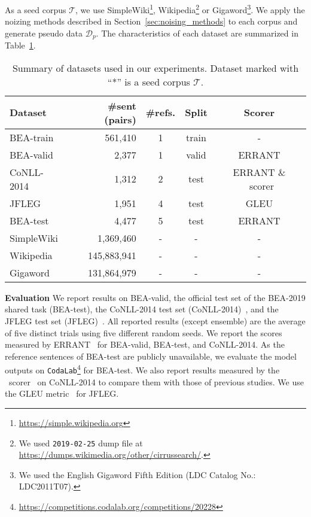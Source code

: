 \documentclass[11pt,a4paper]{article}
\newcommand{\pseudodata}{\ensuremath{\mathcal{D}_{p}}}
\newcommand{\seedcorpus}{\ensuremath{\mathcal{T}}}
\begin{document}
As a seed corpus \seedcorpus{}, we use SimpleWiki\footnote{\url{https://simple.wikipedia.org}}, Wikipedia\footnote{We used \texttt{2019-02-25} dump file at \url{https://dumps.wikimedia.org/other/cirrussearch/}.} or Gigaword\footnote{We used the English Gigaword Fifth Edition (LDC Catalog No.: LDC2011T07).}.
We apply the noizing methods described in Section~\ref{sec:noising_methods} to each corpus and generate pseudo data \pseudodata{}.
The characteristics of each dataset are summarized in Table~\ref{table:data_summary}.


\begin{table}[t]
\centering
\scriptsize
\tabcolsep 1mm
\begin{tabular}{lrccc}
\toprule
Dataset          & \#sent (pairs) & \#refs. & Split & Scorer \\
\midrule
BEA-train        & 561,410 &  1      & train  & - \\
BEA-valid        & 2,377   &  1      & valid  & ERRANT \\
\midrule
CoNLL-2014       & 1,312   &  2      & test   & ERRANT \& ~scorer\\
JFLEG            & 1,951   &  4      & test   & GLEU \\
BEA-test         & 4,477   &  5      & test   & ERRANT \\
\midrule
SimpleWiki    & 1,369,460   &  -    & -  & - \\
Wikipedia     & 145,883,941 &  -    & -  & - \\
Gigaword      & 131,864,979 &  -    & -  & - \\
\bottomrule
\end{tabular}
\vskip -2mm
\caption{Summary of datasets used in our experiments. Dataset marked with ``*'' is a seed corpus \seedcorpus{}.}
\label{table:data_summary}
\end{table}


\noindent\textbf{Evaluation}\hspace*{3mm}
We report results on BEA-valid, the official test set of the BEA-2019 shared task (BEA-test), the CoNLL-2014 test set (CoNLL-2014)~\citep{ng:2014:conll}, and the JFLEG test set (JFLEG)~\citep{napoles:2017:EACL}.
All reported results (except ensemble) are the average of five distinct trials using five different random seeds.
We report the scores measured by ERRANT~\citep{bryant:2017:automatic,felice:2016:automatic} for BEA-valid, BEA-test, and CoNLL-2014.
As the reference sentences of BEA-test are publicly unavailable, we evaluate the model outputs on \texttt{CodaLab}\footnote{\url{https://competitions.codalab.org/competitions/20228}} for BEA-test.
We also report results measured by the ~scorer~\citep{dahlmeier:2012:M2} on CoNLL-2014 to compare them with those of previous studies.
We use the GLEU metric~\citep{napoles:2015:ACL,napoles:2016:gleu} for JFLEG.
\end{document}
